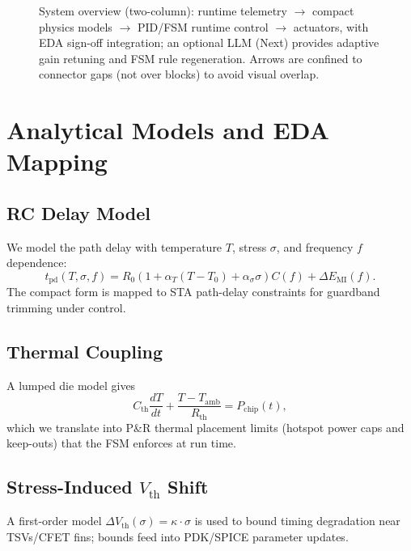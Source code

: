 \documentclass[conference]{IEEEtran}
\begin{document}
\begin{figure}[t]
\caption{System overview (two-column): runtime telemetry $\rightarrow$ compact physics models $\rightarrow$ PID/FSM runtime control $\rightarrow$ actuators, with EDA sign-off integration; an optional LLM (Next) provides adaptive gain retuning and FSM rule regeneration. Arrows are confined to connector gaps (not over blocks) to avoid visual overlap.}
\label{fig:system}
\end{figure}

\section{Analytical Models and EDA Mapping}
\subsection{RC Delay Model}
We model the path delay with temperature $T$, stress $\sigma$, and frequency $f$ dependence:
\begin{equation}
t_{\mathrm{pd}}(T,\sigma,f)=R_0\!\left(1+\alpha_T(T-T_0)+\alpha_\sigma\sigma\right)C(f)+\Delta E_{\mathrm{MI}}(f).
\end{equation}
The compact form is mapped to STA path-delay constraints for guardband trimming under control.

\subsection{Thermal Coupling}
A lumped die model gives
\begin{equation}
C_{\mathrm{th}}\frac{dT}{dt}+\frac{T-T_{\mathrm{amb}}}{R_{\mathrm{th}}}=P_{\mathrm{chip}}(t),
\end{equation}
which we translate into P\&R thermal placement limits (hotspot power caps and keep-outs) that the FSM enforces at run time.

\subsection{Stress-Induced $V_{\mathrm{th}}$ Shift}
A first-order model $\Delta V_{\mathrm{th}}(\sigma)=\kappa\cdot\sigma$ is used to bound timing degradation near TSVs/CFET fins; bounds feed into PDK/SPICE parameter updates.
\end{document}
